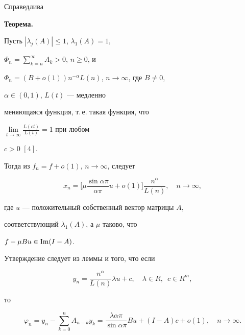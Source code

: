 \medskip 


 


Справедлива 


\medskip 


 


{\bf Теорема.} {\it 


Пусть $|\lambda_j(A)|\le1$, $\lambda_1(A)=1$, 


$\Phi_n=\sum\limits^\infty_{k=n}A_k>0$, $n\ge0$, и 


$\Phi_n=(B+o(1))n^{-\alpha}L(n)$, $n\to\infty$, где $B\ne0$, 


$\alpha\in(0,1)$, $L(t)$ --- медленно 


меняющаяся функция, т.\,е. такая функция, что 


$\lim\limits_{t\to\infty}\frac{L(c{}t)}{L(t)}=1$ при любом 


$c>0$ $[4]$. 


 


Тогда из $f_n=f+o(1)$, $n\to\infty$, следует 


$$ 


x_n=\bigg[\mu\frac{\sin\alpha\pi}{\alpha\pi}u+ 


o(1)\bigg]\frac{n^\alpha}{L(n)},\quad n\to\infty, 


$$ 


где $u$ --- положительный собственный вектор матрицы $A$, 


соответствующий $\lambda_1(A)$, а $\mu$ таково, что 


$f-\mu B u\in\operatorname{Im}(I-A)$. 


} 


\medskip 


 


Утверждение следует из леммы и того, что если 


$$ 


y_n=\frac{n^\alpha}{L(n)}\lambda u+c,\quad 


\lambda\in R,\ \; c\in R^m,


$$ 


то 


$$ 


\varphi_n=y_n-\sum^n_{k=0}A_{n-k}y_k= 


\frac{\lambda\alpha\pi}{\sin\alpha\pi}B u+(I-A)c+ 


o(1),\quad n\to\infty. 


$$ 


